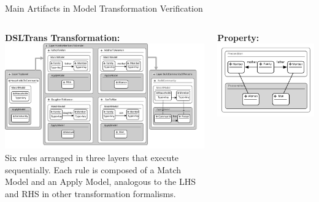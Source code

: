 \documentclass[final,hyperref={pdfpagelabels=false}]{beamer}
\begin{document}
\begin{frame}{}
	
	 \begin{columns}[t]
	   \begin{column}{.71\linewidth}
        \begin{block}{Main Artifacts in Model Transformation Verification}
        \begin{columns}[c]
       \begin{column}{.50\linewidth}
       \begin{center}
         \textbf{DSLTrans Transformation:}\vspace{2cm}
         \includegraphics[width=.9\textwidth]{../figures/presentation/artifacts/transformation}\\
         \vspace{.7cm}\footnotesize{
         Six rules arranged in three layers that execute sequentially.  
         Each rule is composed of a Match Model and an Apply Model, analogous to the LHS and RHS in other transformation formalisms.\vspace{1cm}}
         \end{center}
         \end{column}
         \vrule{}
               \begin{column}{.24\linewidth}
               \begin{center}
          \vspace{-1cm}\textbf{Property:}\vspace{1cm}
            \includegraphics[width=\textwidth]{../figures/presentation/artifacts/property}\\

\end{center}
\end{column}
\end{columns}
\end{block}
\end{column}
\end{columns}
\end{frame}
\end{document}
